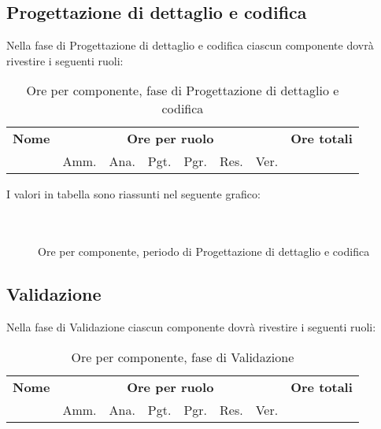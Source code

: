 \pagebreak
\subsection{Progettazione di dettaglio e codifica}

Nella fase di Progettazione di dettaglio e codifica ciascun componente dovrà rivestire i seguenti ruoli:

\begin{table}[H]
\centering
\begin{tabular}{lccccccc}
\toprule 
    \textbf{Nome}  & \multicolumn{6}{c}{\textbf{Ore per ruolo}} & \textbf{Ore totali}\\
     & Amm. & Ana. & Pgt. & Pgr. & Res. & Ver. \\
    \midrule

    	

    \bottomrule
\end{tabular}
\caption{Ore per componente, fase di Progettazione di dettaglio e codifica}
\end{table}

I valori in tabella sono riassunti nel seguente grafico: \\ \\ \\

\begin{figure}[H]
\caption{Ore per componente, periodo di Progettazione di dettaglio e codifica}
\end{figure}
\pagebreak
\subsection{Validazione}

Nella fase di Validazione ciascun componente dovrà rivestire i seguenti ruoli:

\begin{table}[H]
\centering
\begin{tabular}{lccccccc}
\toprule 
    \textbf{Nome}  & \multicolumn{6}{c}{\textbf{Ore per ruolo}} & \textbf{Ore totali}\\
    & Amm. & Ana. & Pgt. & Pgr. & Res. & Ver. \\
    \midrule

        

    \bottomrule
\end{tabular}
\caption{Ore per componente, fase di Validazione}
\end{table}

